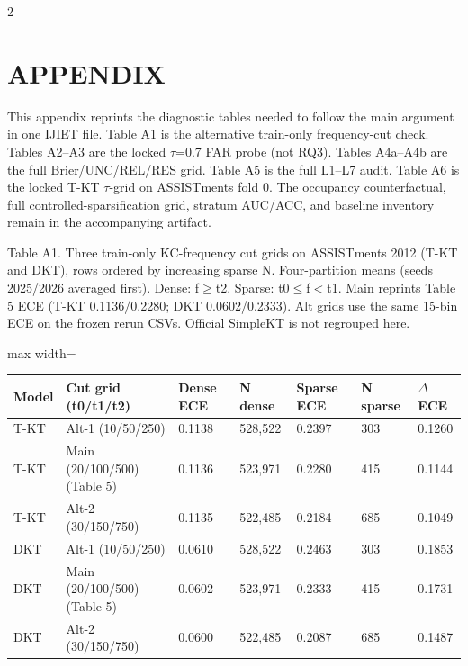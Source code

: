 \documentclass[10pt,a4paper]{article}
\begin{document}
\begin{multicols}{2}
\section*{\MakeUppercase{APPENDIX}}

This appendix reprints the diagnostic tables needed to follow the main argument in one IJIET file. Table A1 is the alternative train-only frequency-cut check. Tables A2--A3 are the locked $\tau$=0.7 FAR probe (not RQ3). Tables A4a--A4b are the full Brier/UNC/REL/RES grid. Table A5 is the full L1--L7 audit. Table A6 is the locked T-KT $\tau$-grid on ASSISTments fold 0. The occupancy counterfactual, full controlled-sparsification grid, stratum AUC/ACC, and baseline inventory remain in the accompanying artifact.


\end{multicols}
\noindent\begin{minipage}{\textwidth}
\centering
{\fontsize{8}{9.5}\selectfont Table A1. Three train-only KC-frequency cut grids on ASSISTments 2012 (T-KT and DKT), rows ordered by increasing sparse N. Four-partition means (seeds 2025/2026 averaged first). Dense: f$\geq$t2. Sparse: t0$\leq$f$<$t1. Main reprints Table 5 ECE (T-KT 0.1136/0.2280; DKT 0.0602/0.2333). Alt grids use the same 15-bin ECE on the frozen rerun CSVs. Official SimpleKT is not regrouped here.\par}
\vspace{0.35em}
\begin{adjustbox}{max width=\textwidth}
{\small
\begin{tabular}{@{}lllllll@{}}
\toprule
Model & Cut grid (t0/t1/t2) & Dense ECE & N dense & Sparse ECE & N sparse & $\Delta$ECE \\
\midrule
T-KT & Alt-1 (10/50/250) & 0.1138 & 528,522 & 0.2397 & 303 & 0.1260 \\
T-KT & Main (20/100/500) (Table 5) & 0.1136 & 523,971 & 0.2280 & 415 & 0.1144 \\
T-KT & Alt-2 (30/150/750) & 0.1135 & 522,485 & 0.2184 & 685 & 0.1049 \\
DKT & Alt-1 (10/50/250) & 0.0610 & 528,522 & 0.2463 & 303 & 0.1853 \\
DKT & Main (20/100/500) (Table 5) & 0.0602 & 523,971 & 0.2333 & 415 & 0.1731 \\
DKT & Alt-2 (30/150/750) & 0.0600 & 522,485 & 0.2087 & 685 & 0.1487 \\
\bottomrule
\end{tabular}}
\end{adjustbox}
\end{minipage}
\end{document}
